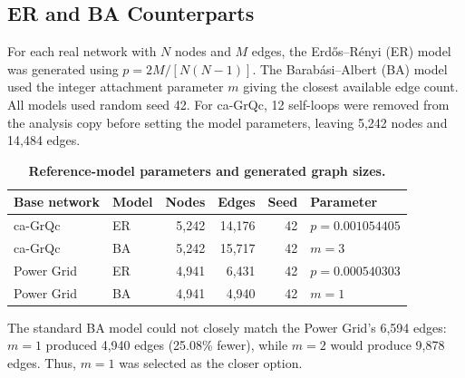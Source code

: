 \subsection{ER and BA Counterparts}

For each real network with $N$ nodes and $M$ edges, the Erd\H{o}s--R\'enyi (ER) model was generated using $p=2M/[N(N-1)]$. The Barab\'asi--Albert (BA) model used the integer attachment parameter $m$ giving the closest available edge count. All models used random seed 42. For ca-GrQc, 12 self-loops were removed from the analysis copy before setting the model parameters, leaving 5,242 nodes and 14,484 edges.

\begin{table}[!htbp]
\centering
\caption{\textbf{Reference-model parameters and generated graph sizes.}}
\label{tab:model-parameters}
\small
\begin{tabularx}{\linewidth}{@{}Xlrrrl@{}}
\toprule
Base network & Model & Nodes & Edges & Seed & Parameter \\
\midrule
ca-GrQc & ER & 5,242 & 14,176 & 42 & $p=0.001054405$ \\
ca-GrQc & BA & 5,242 & 15,717 & 42 & $m=3$ \\
Power Grid & ER & 4,941 & 6,431 & 42 & $p=0.000540303$ \\
Power Grid & BA & 4,941 & 4,940 & 42 & $m=1$ \\
\bottomrule
\end{tabularx}
\end{table}

The standard BA model could not closely match the Power Grid's 6,594 edges: $m=1$ produced 4,940 edges (25.08\% fewer), while $m=2$ would produce 9,878 edges. Thus, $m=1$ was selected as the closer option.
